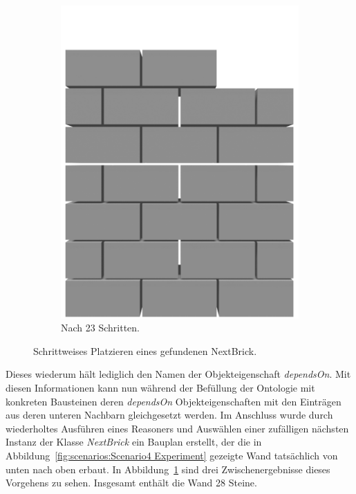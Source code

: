 \begin{figure}[t!]
\begin{subfigure}[b]{0.3\columnwidth}
    \includegraphics[width=\columnwidth]{fig/scenario4_output_23_render.png}
    \caption{Nach 23 Schritten.}
  \end{subfigure}
  \hspace*{\fill}%
  \caption{Schrittweises Platzieren eines gefundenen NextBrick.}\label{fig:poc:result_scenario4}
\end{figure}
Dieses wiederum hält lediglich den Namen der Objekteigenschaft \textit{dependsOn}.
Mit diesen Informationen kann nun während der Befüllung der Ontologie mit konkreten Bausteinen deren \textit{dependsOn} Objekteigenschaften mit den Einträgen aus deren unteren Nachbarn gleichgesetzt werden.
Im Anschluss wurde durch wiederholtes Ausführen eines Reasoners und Auswählen einer zufälligen nächsten Instanz der Klasse {\textit{NextBrick}} ein Bauplan erstellt, der die in Abbildung~\ref{fig:scenarios:Scenario4 Experiment} gezeigte Wand tatsächlich von unten nach oben erbaut.
In Abbildung~\ref{fig:poc:result_scenario4} sind drei Zwischenergebnisse dieses Vorgehens zu sehen.
Insgesamt enthält die Wand 28 Steine.